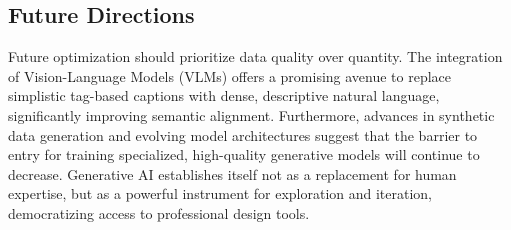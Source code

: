 \subsection{Future Directions}
Future optimization should prioritize data quality over quantity. The integration of Vision-Language Models (VLMs) offers a promising avenue to replace simplistic tag-based captions with dense, descriptive natural language, significantly improving semantic alignment. Furthermore, advances in synthetic data generation and evolving model architectures suggest that the barrier to entry for training specialized, high-quality generative models will continue to decrease.
Generative AI establishes itself not as a replacement for human expertise, but as a powerful instrument for exploration and iteration, democratizing access to professional design tools.

